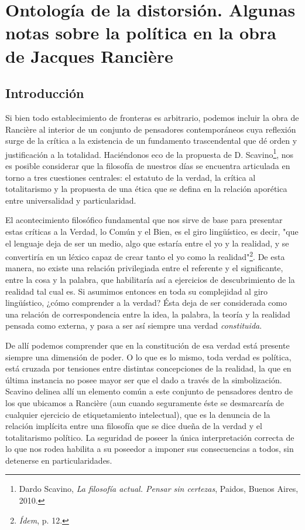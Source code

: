 \chapter{Ontología de la distorsión. Algunas notas sobre la política en la obra de Jacques Rancière}

\section{Introducción}

Si bien todo establecimiento de fronteras es arbitrario, podemos incluir
la obra de Rancière al interior de un conjunto de pensadores
contemporáneos cuya reflexión surge de la crítica a la existencia de un
fundamento trascendental que dé orden y justificación a la totalidad.
Haciéndonos eco de la propuesta de D. Scavino\footnote{Dardo Scavino,
  \emph{La filosofía actual. Pensar sin certezas}, Paidos, Buenos Aires,
  2010.}, nos es posible considerar que la filosofía de nuestros días se
encuentra articulada en torno a tres cuestiones centrales: el estatuto
de la verdad, la crítica al totalitarismo y la propuesta de una ética
que se defina en la relación aporética entre universalidad y
particularidad.

El acontecimiento filosófico fundamental que nos sirve de base para
presentar estas críticas a la Verdad, lo Común y el Bien, es el giro
lingüístico, es decir, "que el lenguaje deja de ser un medio, algo que
estaría entre el yo y la realidad, y se convertiría en un léxico capaz
de crear tanto el yo como la realidad"\footnote{\emph{Ídem}, p. 12.}. De
esta manera, no existe una relación privilegiada entre el referente y el
significante, entre la cosa y la palabra, que habilitaría así a
ejercicios de descubrimiento de la realidad tal cual es. Si asumimos
entonces en toda su complejidad al giro lingüístico, ¿cómo comprender a
la verdad? Ésta deja de ser considerada como una relación de
correspondencia entre la idea, la palabra, la teoría y la realidad
pensada como externa, y pasa a ser así siempre una verdad
\emph{constituida}.

De allí podemos comprender que en la constitución de esa verdad está
presente siempre una dimensión de poder. O lo que es lo mismo, toda
verdad es política, está cruzada por tensiones entre distintas
concepciones de la realidad, la que en última instancia no posee mayor
ser que el dado a través de la simbolización. Scavino delinea allí un
elemento común a este conjunto de pensadores dentro de los que ubicamos
a Rancière (aun cuando seguramente éste se desmarcaría de cualquier
ejercicio de etiquetamiento intelectual), que es la denuncia de la
relación implícita entre una filosofía que se dice dueña de la verdad y
el totalitarismo político. La seguridad de poseer la única
interpretación correcta de lo que nos rodea habilita a su poseedor a
imponer sus consecuencias a todos, sin detenerse en particularidades.

